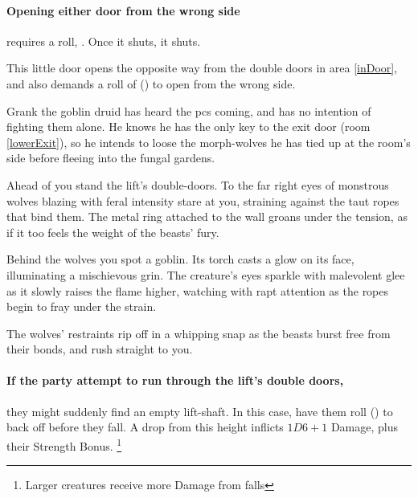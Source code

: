 \begin{multicols}{2}
\paragraph{Opening either door from the wrong side}
requires a  roll, \tn[10].
Once it shuts, it shuts.


This little door opens the opposite way from the double doors in area \ref{inDoor}, and also demands a roll of  (\tn[10]) to open from the wrong side.



Grank the goblin druid has heard the \glspl{pc} coming, and has no intention of fighting them alone.
He knows he has the only key to the exit door (room \vref{lowerExit}), so he intends to loose the morph-wolves he has tied up at the room's side before fleeing into the fungal gardens.

\begin{boxtext}
  Ahead of you stand the lift's double-doors.
  To the far right eyes of monstrous wolves blazing with feral intensity stare at you, straining against the taut ropes that bind them.
  The metal ring attached to the wall groans under the tension, as if it too feels the weight of the beasts' fury.

  Behind the wolves you spot a goblin.
  Its torch casts a glow on its face, illuminating a mischievous grin.
  The creature's eyes sparkle with malevolent glee as it slowly raises the flame higher, watching with rapt attention as the ropes begin to fray under the strain.

  The wolves' restraints rip off in a whipping snap as the beasts burst free from their bonds, and rush straight to you.
\end{boxtext}

\paragraph{If the party attempt to run through the lift's double doors,}
they might suddenly find an empty lift-shaft.
In this case, have them roll  (\tn[7]) to back off before they fall.
A drop from this height inflicts $1D6+1$ Damage, plus their Strength Bonus.%
\footnote{Larger creatures receive more Damage from falls}



\end{multicols}
